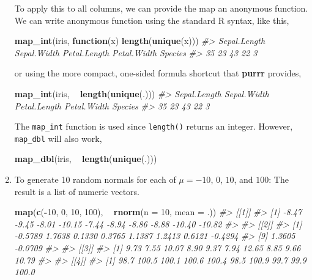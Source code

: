 \documentclass[]{book}
\newenvironment{Shaded}{\begin{snugshade}}{\end{snugshade}}
\newcommand{\CommentTok}[1]{\textcolor[rgb]{0.56,0.35,0.01}{\textit{#1}}}
\newcommand{\ControlFlowTok}[1]{\textcolor[rgb]{0.13,0.29,0.53}{\textbf{#1}}}
\newcommand{\DataTypeTok}[1]{\textcolor[rgb]{0.13,0.29,0.53}{#1}}
\newcommand{\DecValTok}[1]{\textcolor[rgb]{0.00,0.00,0.81}{#1}}
\newcommand{\KeywordTok}[1]{\textcolor[rgb]{0.13,0.29,0.53}{\textbf{#1}}}
\newcommand{\NormalTok}[1]{#1}
\newcommand{\OperatorTok}[1]{\textcolor[rgb]{0.81,0.36,0.00}{\textbf{#1}}}
\newcommand{\StringTok}[1]{\textcolor[rgb]{0.31,0.60,0.02}{#1}}
\theoremstyle{plain}
\theoremstyle{remark}
\begin{document}
\begin{enumerate}
  To apply this to all columns, we can provide the map an anonymous function.
  We can write anonymous function using the standard R syntax, like this,

\begin{Shaded}
\begin{Highlighting}[]
\KeywordTok{map_int}\NormalTok{(iris, }\ControlFlowTok{function}\NormalTok{(x) }\KeywordTok{length}\NormalTok{(}\KeywordTok{unique}\NormalTok{(x)))}
\CommentTok{#> Sepal.Length  Sepal.Width Petal.Length  Petal.Width      Species }
\CommentTok{#>           35           23           43           22            3}
\end{Highlighting}
\end{Shaded}

  or using the more compact, one-sided formula shortcut that \textbf{purrr} provides,

\begin{Shaded}
\begin{Highlighting}[]
\KeywordTok{map_int}\NormalTok{(iris, }\OperatorTok{~}\StringTok{ }\KeywordTok{length}\NormalTok{(}\KeywordTok{unique}\NormalTok{(.)))}
\CommentTok{#> Sepal.Length  Sepal.Width Petal.Length  Petal.Width      Species }
\CommentTok{#>           35           23           43           22            3}
\end{Highlighting}
\end{Shaded}

  The \texttt{map\_int} function is used since \texttt{length()} returns an integer.
  However, \texttt{map\_dbl} will also work,

\begin{Shaded}
\begin{Highlighting}[]
\KeywordTok{map_dbl}\NormalTok{(iris, }\OperatorTok{~}\StringTok{ }\KeywordTok{length}\NormalTok{(}\KeywordTok{unique}\NormalTok{(.)))    }
\end{Highlighting}
\end{Shaded}
\item
  To generate 10 random normals for each of \(\mu = -10\), \(0\), \(10\), and \(100\):
  The result is a list of numeric vectors.

\begin{Shaded}
\begin{Highlighting}[]
\KeywordTok{map}\NormalTok{(}\KeywordTok{c}\NormalTok{(}\OperatorTok{-}\DecValTok{10}\NormalTok{, }\DecValTok{0}\NormalTok{, }\DecValTok{10}\NormalTok{, }\DecValTok{100}\NormalTok{), }\OperatorTok{~}\StringTok{ }\KeywordTok{rnorm}\NormalTok{(}\DataTypeTok{n =} \DecValTok{10}\NormalTok{, }\DataTypeTok{mean =}\NormalTok{ .))}
\CommentTok{#> [[1]]}
\CommentTok{#>  [1]  -8.47  -9.45  -8.01 -10.15  -7.44  -8.94  -8.86  -8.88 -10.40 -10.82}
\CommentTok{#> }
\CommentTok{#> [[2]]}
\CommentTok{#>  [1] -0.5789  1.7638  0.1330  0.3765  1.1387  1.2413  0.6121 -0.4294}
\CommentTok{#>  [9]  1.3605 -0.0709}
\CommentTok{#> }
\CommentTok{#> [[3]]}
\CommentTok{#>  [1]  9.73  7.55 10.07  8.90  9.37  7.94 12.65  8.85  9.66 10.79}
\CommentTok{#> }
\CommentTok{#> [[4]]}
\CommentTok{#>  [1]  98.7 100.5 100.1 100.6 100.4  98.5 100.9  99.7  99.9 100.0}
\end{Highlighting}
\end{Shaded}


\end{enumerate}
\end{document}

